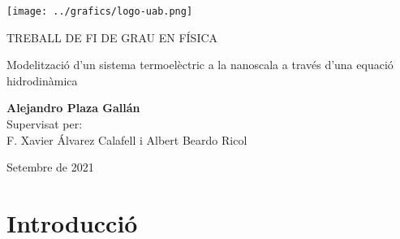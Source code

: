\documentclass{article}
\begin{document}
\begin{titlepage}
\centering
\texttt{[image: ../grafics/logo-uab.png]}\par\vspace{1cm}
\vspace{3cm}


{\scshape\Huge TREBALL DE FI DE GRAU EN F\'{I}SICA\par}
\vspace{0.5cm}
{\huge Modelitzaci\'{o} d'un sistema termoel\`{e}ctric a la nanoscala a trav\'{e}s d'una equaci\'{o} hidrodin\`{a}mica\par}
\vspace{5cm}
{\Large \textbf{Alejandro Plaza Gall\'{a}n}\\\vfill\vfill\vfill Supervisat per:\\ F. Xavier \'{A}lvarez Calafell i Albert Beardo Ricol
\par}
\vspace{2cm}
\vfill
\par
\vfill
{\large Setembre de 2021\par}
\end{titlepage}
\newpage
\tableofcontents
\newpage

\begin{abstract}

En un recent treball s'ha vist que, quan s'escalfa directament un substrat de germani amb un l\`{a}ser amb una penetraci\'{o} \`{o}ptica molt petita, s'aconsegueix reduir els efectes no locals i per tant es minimitza la influ\`{e}ncia del terme no local de la equaci\'{o} hidrodin\`{a}mica. En aquest treball utilitzem aquest fet experimental per dissenyar una forma de reduir la temperatura de l\'{i}nies met\`{a}l\textperiodcentered liques escalfades per una font t\`{e}rmica i posades sobre substrats de semiconductor. Quan simulem segons el model hidrodin\`{a}mic aquesta configuraci\'{o} i hi afegim un l\`{a}ser amb poca profunditat \`{o}ptica, aconseguim reduir la temperatura de la l\'{i}nia met\`{a}l\textperiodcentered lica. Aquesta simulaci\'{o} reprodueix un transistor en un xip i per tant aquest m\`{e}tode podria servir per reduir la temperatura dels dispositius electr\`{o}nics actuals.
\end{abstract}

\section{Introducci\'{o}}
\end{document}
